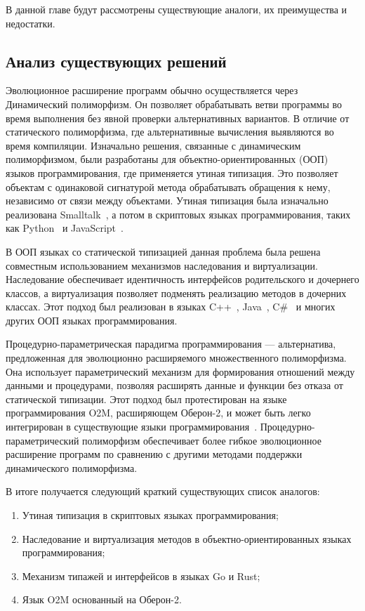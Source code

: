 В данной главе будут рассмотрены существующие аналоги, их преимущества и недостатки.

\subsection{Анализ существующих решений}

Эволюционное расширение программ обычно осуществляется через Динамический полиморфизм.
Он позволяет обрабатывать ветви программы во время выполнения без явной проверки альтернативных вариантов.
В отличие от статического полиморфизма, где альтернативные вычисления выявляются во время компиляции. Изначально решения, связанные с динамическим полиморфизмом, были разработаны для объектно-ориентированных (ООП) языков программирования, где применяется утиная типизация. Это позволяет объектам с одинаковой сигнатурой метода обрабатывать обращения к нему, независимо от связи между объектами. Утиная типизация была изначально реализована Smalltalk~\cite{shafer2012practical}, а потом в скриптовых языках программирования, таких как Python~\cite{hunt2019advanced} и JavaScript~\cite{diaz2008pro}.

В ООП языках со статической типизацией данная проблема была решена совместным использованием механизмов наследования и виртуализации.
Наследование обеспечивает идентичность интерфейсов родительского и дочернего классов, а виртуализация позволяет подменять реализацию методов в дочерних классах. Этот подход был реализован в языках C++~\cite{bookcplusplus}, Java~\cite{bookjava}, C\#~\cite{albahari2010c} и многих других ООП языках программирования.

Процедурно-параметрическая парадигма программирования --- альтернатива, предложенная для эволюционно расширяемого множественного полиморфизма. Она использует параметрический механизм для формирования отношений между данными и процедурами, позволяя расширять данные и функции без отказа от статической типизации. Этот подход был протестирован на языке программирования O2M, расширяющем Оберон-2, и может быть легко интегрирован в существующие языки программирования~\cite{легалов2003процедурный}. Процедурно-параметрический полиморфизм обеспечивает более гибкое эволюционное расширение программ по сравнению с другими методами поддержки динамического полиморфизма.

В итоге получается следующий краткий существующих список аналогов:
\begin{enumerate}
  \item Утиная типизация в скриптовых языках программирования;
  \item Наследование и виртуализация методов в объектно-ориентированных языках программирования;
  \item Механизм типажей и интерфейсов в языках Go и Rust;
  \item Язык O2M основанный на Оберон-2.
\end{enumerate}


